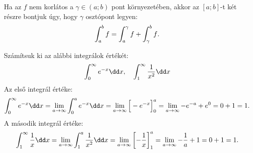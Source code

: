 \begin{note}
  Ha az $f$ nem korlátos a $\gamma \in (a;b)$ pont környezetében, akkor az
  $[a; b]$-t két részre bontjuk úgy, hogy $\gamma$ osztópont legyen:
  \[
    \int_a^b f = \int_a^\gamma f + \int_\gamma^b f
    \text.
  \]
\end{note}

\begin{example}
  Számítsuk ki az alábbi integrálok értékét:
  \[
    \int_0^\infty e^{-x} \dd x
    \text, \quad
    \int_1^\infty \frac{1}{x^2} \dd x
  \]
  Az első integrál értéke:
  \[
    \int_0^\infty e^{-x} \dd x
    = \lim_{a \rightarrow \infty} \int_0^a e^{-x} \dd x
    = \lim_{a \rightarrow \infty} \Big[ -e^{-x} \Big]_0^a
    = \lim_{a \rightarrow \infty} -e^{-a} + e^0
    = 0 + 1
    = 1
    \text.
  \]
  A második integrál értéke:
  \[
    \int_1^\infty \frac{1}{x} \dd x
    = \lim_{a \rightarrow \infty} \int_1^a \frac{1}{x^2} \dd x
    = \lim_{a \rightarrow \infty} \left[ -\frac{1}{x} \right]_1^a
    = \lim_{a \rightarrow \infty} -\frac{1}{a} + 1
    = 0 + 1
    = 1
    \text.
  \]
\end{example}